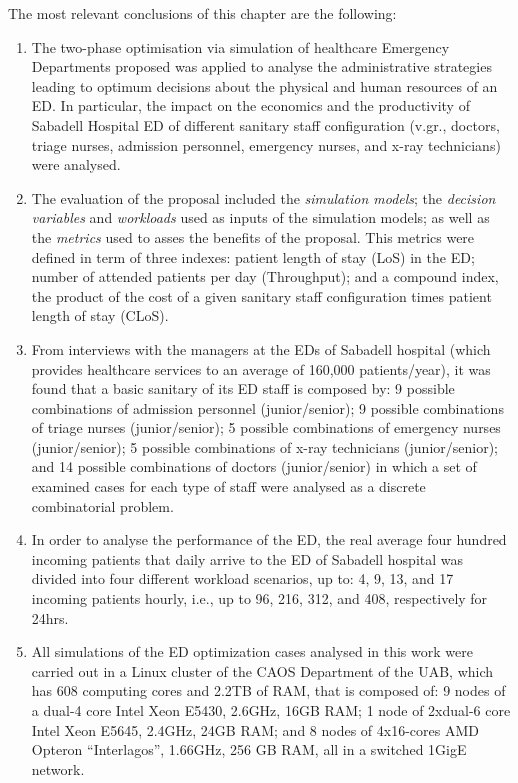 The most relevant conclusions of this chapter are the following:
\begin{enumerate}
\item The two-phase optimisation via simulation of healthcare Emergency
Departments proposed was applied to analyse the administrative strategies
leading to optimum decisions about the physical and human resources
of an ED. In particular, the impact on the economics and the productivity
of Sabadell Hospital ED of different sanitary staff configuration
(v.gr., doctors, triage nurses, admission personnel, emergency nurses,
and x-ray technicians) were analysed.\\

\item The evaluation of the proposal included the \textit{simulation models};
the \textit{decision variables} and\textit{ workloads} used as inputs
of the simulation models; as well as the \textit{metrics} used to
asses the benefits of the proposal. This metrics were defined in term
of three indexes: patient length of stay (LoS) in the ED; number of
attended patients per day (Throughput); and a compound index, the
product of the cost of a given sanitary staff configuration times
patient length of stay (CLoS).\\

\item From interviews with the managers at the EDs of Sabadell hospital
(which provides healthcare services to an average of 160,000 patients/year),
it was found that a basic sanitary of its ED staff is composed by:
9 possible combinations of admission personnel (junior/senior); 9
possible combinations of triage nurses (junior/senior); 5 possible
combinations of emergency nurses (junior/senior); 5 possible combinations
of x-ray technicians (junior/senior); and 14 possible combinations
of doctors (junior/senior) in which a set of examined cases for each
type of staff were analysed as a discrete combinatorial problem.\\

\item In order to analyse the performance of the ED, the real average four
hundred incoming patients that daily arrive to the ED of Sabadell
hospital was divided into four different workload scenarios, up to:
4, 9, 13, and 17 incoming patients hourly, i.e., up to 96, 216, 312,
and 408, respectively for 24hrs.\\

\item All simulations of the ED optimization cases analysed in this work
were carried out in a Linux cluster of the CAOS Department of the
UAB, which has 608 computing cores and 2.2TB of RAM, that is composed
of: 9 nodes of a dual-4 core Intel Xeon E5430, 2.6GHz, 16GB RAM; 1
node of 2xdual-6 core Intel Xeon E5645, 2.4GHz, 24GB RAM; and 8 nodes
of 4x16-cores AMD Opteron ``Interlagos'', 1.66GHz, 256 GB RAM, all
in a switched 1GigE network.\\


\end{enumerate}
